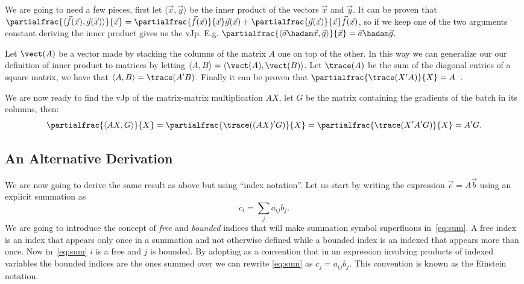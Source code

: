 \documentclass{article}
\begin{document}
We are going to need a few pieces, first let \(\langle\vec x,\vec y\rangle\) be
the inner product of the vectors \(\vec x\) and \(\vec y.\) It can be proven
that \(\partialfrac{\langle\vec f(\vec x),\vec g(\vec x)\rangle}{\vec x}
= \partialfrac{\vec f(\vec x)}{\vec x} \vec g(\vec x)
	+ \partialfrac{\vec g(\vec x)}{\vec x} \vec f(\vec x)\), so if we keep one
of the two arguments constant deriving the inner product gives us the vJp. E.g.
\(\partialfrac{\langle\vec a \hadam \vec x,\vec g\rangle}{\vec x}
= \vec a \hadam \vec g.\)

Let \(\vect(A)\) be a vector made by stacking the columns of the matrix \(A\)
one on top of the other. In this way we can generalize our our definition of
inner product to matrices by letting \(\langle A,B\rangle =
\langle\vect(A),\vect(B)\rangle\). Let \(\trace(A)\) be the sum of the diagonal
entries of a square matrix, we have that \(\langle A,B\rangle = \trace(A'B)\).
Finally it can be proven that \(\partialfrac{\trace(X'A)}{X} =
A\)~\cite{cookbook,magnus}.

We are now ready to find the vJp of the matrix-matrix multiplication \(A X\),
let \(G\) be the matrix containing the gradients of the batch in its columns,
then: \[
\partialfrac{\langle AX,G\rangle}{X}
= \partialfrac{\trace((AX)'G)}{X}
= \partialfrac{\trace(X'A'G)}{X}
= A'G.\]


\subsection{An Alternative Derivation}


We are now going to derive the same result as above but using ``index
notation''. Let us start by writing the expression \(\vec c = A \vec b\) using an
explicit summation as
\begin{equation}
	c_i = \sum_j a_{ij} b_j. \label{eq:sum}
\end{equation}
We are going to introduce the concept of \emph{free} and \emph{bounded} indices
that will make summation symbol superfluous in~\ref{eq:sum}. A free index is an
index that appears only once in a summation and not otherwise defined while a
bounded index is an indexed that appears more than once. Now in~\ref{eq:sum}
\(i\) is a free and \(j\) is bounded. By adopting as a convention that in an
expression involving products of indexed variables the bounded indices are the
ones summed over we can rewrite \ref{eq:sum} as \(c_j = a_{ij} b_{j}\). This
convention is known as the Einstein notation.
\end{document}
